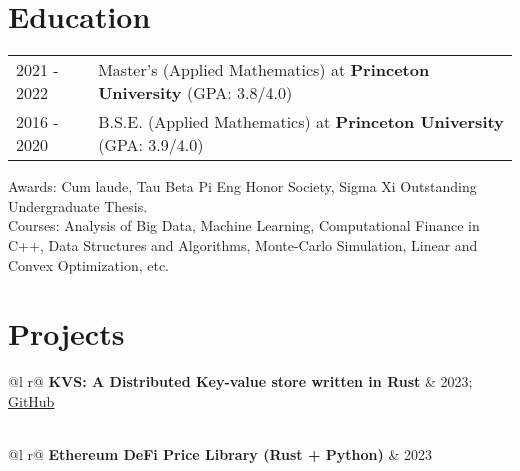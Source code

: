 \documentclass[a4paper,12pt]{article}
\begin{document}
\section{Education}

\begin{tabularx}{\linewidth}{@{}l X@{}}	
2021 - 2022 & Master's (Applied Mathematics) at \textbf{Princeton University} \hfill \normalsize (GPA: 3.8/4.0) \\

2016 - 2020 & B.S.E. (Applied Mathematics) at \textbf{Princeton University} \hfill (GPA: 3.9/4.0) \\ 

\end{tabularx}

Awards: Cum laude, Tau Beta Pi Eng Honor Society, Sigma Xi Outstanding Undergraduate Thesis. \\
Courses: Analysis of Big Data, Machine Learning, Computational Finance in C++, Data Structures and Algorithms, Monte-Carlo Simulation, Linear and Convex Optimization, etc.


\section{Projects}
\begin{tabularx}{\linewidth}{ @{}l r@{} }
\textbf{KVS: A Distributed Key-value store written in Rust} & \hfill 2023; \href{https://github.com/cjeva10/kvs}{GitHub} \\[3.75pt]
  \\
\end{tabularx}

\begin{tabularx}{\linewidth}{ @{}l r@{} }
\textbf{Ethereum DeFi Price Library (Rust + Python)} & \hfill 2023 \\[3.75pt]
  \\
\end{tabularx}
\end{document}
